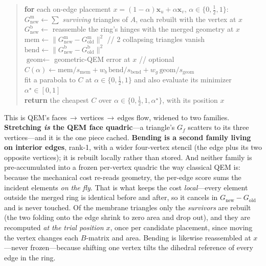 \begin{quote}
\hspace*{1.5em} \textbf{for} each on-edge placement $x=(1-\alpha)\mathbf{x}_u+\alpha\mathbf{x}_v$, $\alpha\in\{0,\tfrac12,1\}$: \\
\hspace*{3em} $G^{\mathrm m}_{\text{new}}\leftarrow\sum$ \emph{surviving} triangles of $A$, each rebuilt with the vertex at $x$ \\
\hspace*{3em} $G^{\mathrm b}_{\text{new}}\leftarrow$ reassemble the ring's hinges with the merged geometry at $x$ \\
\hspace*{3em} $\text{mem}\leftarrow\|G^{\mathrm m}_{\text{new}}-G^{\mathrm m}_{\text{old}}\|^2$ \hfill // 2 collapsing triangles vanish \\
\hspace*{3em} $\text{bend}\leftarrow\|G^{\mathrm b}_{\text{new}}-G^{\mathrm b}_{\text{old}}\|^2$ \\
\hspace*{3em} $\text{geom}\leftarrow$ geometric-QEM error at $x$ \hfill // optional \\
\hspace*{3em} $C(\alpha)\leftarrow \text{mem}/s_{\text{mem}}+w_b\,\text{bend}/s_{\text{bend}}+w_g\,\text{geom}/s_{\text{geom}}$ \\
\hspace*{1.5em} fit a parabola to $C$ at $\alpha\in\{0,\tfrac12,1\}$ and also evaluate its minimizer $\alpha^\star\!\in[0,1]$ \\
\hspace*{1.5em} \textbf{return} the cheapest $C$ over $\alpha\in\{0,\tfrac12,1,\alpha^\star\}$, with its position $x$
\end{quote}

\noindent This is QEM's faces\,$\to$\,vertices\,$\to$\,edges flow, widened to two families.
\textbf{Stretching \emph{is} the QEM face quadric}---a triangle's $G_f$ scatters to its three vertices---and it is the one piece cached.
\textbf{Bending is a second family living on interior edges}, rank-1, with a wider four-vertex stencil (the edge plus its two opposite vertices); it is rebuilt locally rather than stored.
And neither family is pre-accumulated into a frozen per-vertex quadric the way classical QEM is: because the mechanical cost re-reads geometry, the per-edge score sums the incident elements \emph{on the fly}.
That is what keeps the cost \emph{local}---every element outside the merged ring is identical before and after, so it cancels in $G_{\text{new}}-G_{\text{old}}$ and is never touched.
Of the membrane triangles only the \emph{survivors} are rebuilt (the two folding onto the edge shrink to zero area and drop out), and they are recomputed \emph{at the trial position $x$}, once per candidate placement, since moving the vertex changes each $B$-matrix and area.
Bending is likewise reassembled at $x$---never frozen---because shifting one vertex tilts the dihedral reference of every edge in the ring.


